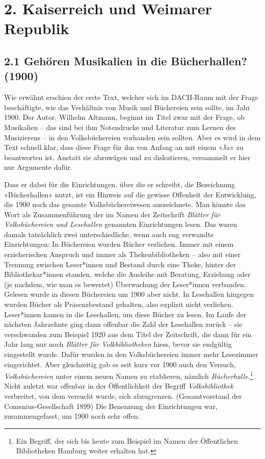 \documentclass[a4paper,
fontsize=11pt,
oneside,
numbers=noperiodatend,
parskip=half-,
bibliography=totoc,
final
]{scrartcl}
\begin{document}
\hypertarget{kaiserreich-und-weimarer-republik}{%
\section{2. Kaiserreich und Weimarer
Republik}\label{kaiserreich-und-weimarer-republik}}

\hypertarget{gehuxf6ren-musikalien-in-die-buxfccherhallen-1900}{%
\subsection{2.1 Gehören Musikalien in die Bücherhallen?
(1900)}\label{gehuxf6ren-musikalien-in-die-buxfccherhallen-1900}}

Wie erwähnt erschien der erste Text, welcher sich im DACH-Raum mit der
Frage beschäftigte, wie das Verhältnis von Musik und Büchereien sein
sollte, im Jahr 1900. Der Autor, Wilhelm Altmann, beginnt im Titel zwar
mit der Frage, ob Musikalien -- das sind bei ihm Notendrucke und
Literatur zum Lernen des Musizierens -- in den Volksbüchereien vorhanden
sein sollten. Aber es wird in dem Text schnell klar, dass diese Frage
für ihn von Anfang an mit einem «Ja» zu beantworten ist. Anstatt sie
abzuwägen und zu diskutieren, versammelt er hier nur Argumente dafür.

Dass er dabei für die Einrichtungen, über die er schreibt, die
Bezeichnung «Bücherhallen» nutzt, ist ein Hinweis auf die gewisse
Offenheit der Entwicklung, die 1900 noch das gesamte Volksbüchereiwesen
auszeichnete. Man könnte das Wort als Zusammenführung der im Namen der
Zeitschrift \emph{Blätter für Volksbüchereien und Lesehallen} genannten
Einrichtungen lesen. Das waren damals tatsächlich zwei unterschiedliche,
wenn auch eng verwandte Einrichtungen: In Büchereien wurden Bücher
verliehen. Immer mit einem erzieherischen Anspruch und immer als
Thekenbibliotheken -- also mit einer Trennung zwischen Leser*innen und
Bestand durch eine Theke, hinter der Bibliothekar*innen standen, welche
die Ausleihe mit Beratung, Erziehung oder (je nachdem, wie man es
bewertet) Überwachung der Leser*innen verbanden. Gelesen wurde in diesen
Büchereien um 1900 aber nicht. In Lesehallen hingegen wurden Bücher als
Präsenzbestand gehalten, also explizit nicht verliehen. Leser*innen
kamen in die Lesehallen, um diese Bücher zu lesen. Im Laufe der nächsten
Jahrzehnte ging dann offenbar die Zahl der Lesehallen zurück -- sie
verschwanden zum Beispiel 1920 aus dem Titel der Zeitschrift, die dann
für ein Jahr lang nur noch \emph{Blätter für Volkbibliotheken} hiess,
bevor sie endgültig eingestellt wurde. Dafür wurden in den
Volksbüchereien immer mehr Lesezimmer eingerichtet. Aber gleichzeitig
gab es seit kurz vor 1900 auch den Versuch, \emph{Volksbüchereien} unter
einem neuen Namen zu etablieren, nämlich \emph{Bücherhalle}.\footnote{Ein
  Begriff, der sich bis heute zum Beispiel im Namen der Öffentlichen
  Bibliotheken Hamburg weiter erhalten hat.} Nicht zuletzt war offenbar
in der Öffentlichkeit der Begriff \emph{Volksbibliothek} verbreitet, von
dem versucht wurde, sich abzugrenzen. (Gesamtvorstand der
Comenius-Gesellschaft 1899) Die Benennung der Einrichtungen war,
zusammengefasst, um 1900 noch sehr offen.
\end{document}
